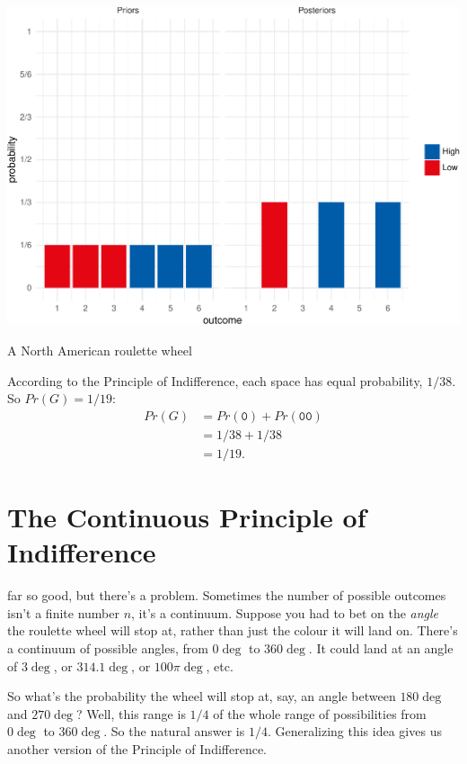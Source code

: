 \documentclass[justified]{tufte-book}
\newcommand{\pr}{Pr}
\theoremstyle{definition}
\theoremstyle{definition}
\theoremstyle{definition}
\theoremstyle{remark}
\begin{document}
\begin{marginfigure}
\includegraphics{_main_files/figure-latex/unnamed-chunk-133-1} \caption[A North American roulette wheel]{A North American roulette wheel}\label{fig:unnamed-chunk-133}
\end{marginfigure}

According to the Principle of Indifference, each space has equal
probability, \(1/38\). So \(\pr(G) = 1/19\): \[
  \begin{aligned}
    \pr(G) &= \pr(\mathtt{0}) + \pr(\mathtt{00})\\
           &= 1/38 + 1/38\\
           &= 1/19.
  \end{aligned}
\]

\hypertarget{the-continuous-principle-of-indifference}{%
\section{The Continuous Principle of
Indifference}\label{the-continuous-principle-of-indifference}}

 far so good, but there's a problem. Sometimes the number
of possible outcomes isn't a finite number \(n\), it's a continuum.
Suppose you had to bet on the \emph{angle} the roulette wheel will stop
at, rather than just the colour it will land on. There's a continuum of
possible angles, from \(0\deg\) to \(360\deg\). It could land at an
angle of \(3\deg\), or \(314.1\deg\), or \(100\pi\deg\), etc.

So what's the probability the wheel will stop at, say, an angle between
\(180\deg\) and \(270\deg\)? Well, this range is \(1/4\) of the whole
range of possibilities from \(0\deg\) to \(360\deg\). So the natural
answer is \(1/4\). Generalizing this idea gives us another version of
the Principle of Indifference.
\end{document}
